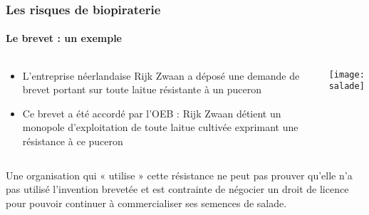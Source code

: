 \begin{frame}
\frametitle{Les risques de biopiraterie}
\framesubtitle{Le brevet : un exemple}

\begin{columns}

\begin{column}{.8\textwidth}
\begin{itemize}
\item L’entreprise néerlandaise Rijk Zwaan a déposé une demande de brevet portant sur toute laitue résistante à un puceron 
\item  Ce brevet a été accordé par l’OEB : Rijk Zwaan détient un monopole d’exploitation de toute laitue cultivée exprimant une résistance à ce puceron
\end{itemize}
\end{column}

\begin{column}{.2\textwidth}
\texttt{[image: salade]}
\end{column}

\end{columns}

\vfill

Une organisation qui « utilise » cette résistance ne peut pas prouver qu'elle n'a pas utilisé l’invention brevetée et est contrainte de négocier un droit de licence pour pouvoir continuer à commercialiser ses semences de salade. 

\vfill


\end{frame}

